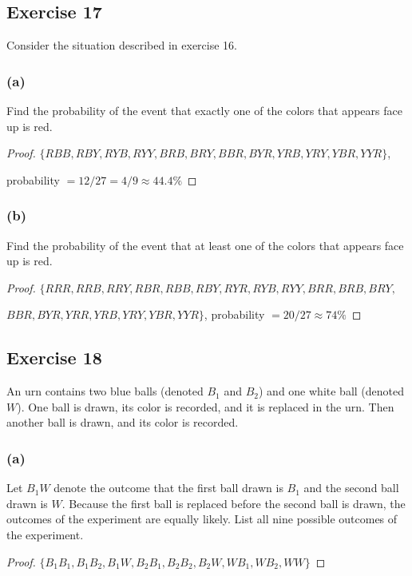\documentclass[14pt]{extarticle}
\begin{document}
\subsection{Exercise 17}
Consider the situation described in exercise 16.

\subsubsection{(a)}
Find the probability of the event that exactly one of the colors that appears face up is red.

\begin{proof}
\(\{RBB, RBY, RYB, RYY, BRB, BRY, BBR, BYR, YRB, YRY, YBR, YYR\}\), 

probability \(= 12/27 = 4/9 \approx 44.4\%\)
\end{proof}

\subsubsection{(b)}
Find the probability of the event that at least one of the colors that appears face up is red.

\begin{proof}
\(\{RRR, RRB, RRY, RBR, RBB, RBY, RYR, RYB, RYY, BRR, BRB, BRY,\) 

\(BBR, BYR, YRR, YRB, YRY, YBR, YYR\}\), probability \(= 20/27 \approx 74\%\)
\end{proof}

\subsection{Exercise 18}
An urn contains two blue balls (denoted \(B_1\) and \(B_2\)) and one white ball (denoted \(W\)). One ball is 
drawn, its color is recorded, and it is replaced in the urn. Then another ball is drawn, and its color is recorded.

\subsubsection{(a)}
Let \(B_1 W\) denote the outcome that the first ball drawn is \(B_1\) and the second ball drawn is \(W\). Because the 
first ball is replaced before the second ball is drawn, the outcomes of the experiment are equally likely. List all 
nine possible outcomes of the experiment.

\begin{proof}
\(\{B_1B_1, B_1B_2, B_1W, B_2B_1, B_2B_2, B_2W, WB_1, WB_2, WW\}\)
\end{proof}
\end{document}
